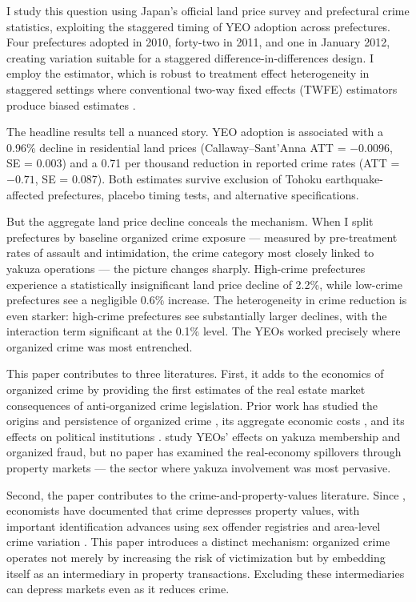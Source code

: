 \documentclass[12pt]{article}
\begin{document}
I study this question using Japan's official land price survey and prefectural crime statistics, exploiting the staggered timing of YEO adoption across prefectures. Four prefectures adopted in 2010, forty-two in 2011, and one in January 2012, creating variation suitable for a staggered difference-in-differences design. I employ the \citet{callaway2021difference} estimator, which is robust to treatment effect heterogeneity in staggered settings where conventional two-way fixed effects (TWFE) estimators produce biased estimates \citep{goodmanbacon2021difference}.

The headline results tell a nuanced story. YEO adoption is associated with a 0.96\% decline in residential land prices (Callaway--Sant'Anna ATT = $-0.0096$, SE = 0.003) and a 0.71 per thousand reduction in reported crime rates (ATT = $-0.71$, SE = 0.087). Both estimates survive exclusion of Tohoku earthquake-affected prefectures, placebo timing tests, and alternative specifications.

But the aggregate land price decline conceals the mechanism. When I split prefectures by baseline organized crime exposure --- measured by pre-treatment rates of assault and intimidation, the crime category most closely linked to yakuza operations --- the picture changes sharply. High-crime prefectures experience a statistically insignificant land price decline of 2.2\%, while low-crime prefectures see a negligible 0.6\% increase. The heterogeneity in crime reduction is even starker: high-crime prefectures see substantially larger declines, with the interaction term significant at the 0.1\% level. The YEOs worked precisely where organized crime was most entrenched.

This paper contributes to three literatures. First, it adds to the economics of organized crime by providing the first estimates of the real estate market consequences of anti-organized crime legislation. Prior work has studied the origins and persistence of organized crime \citep{bandiera2003land, buonanno2015poor}, its aggregate economic costs \citep{pinotti2015economic}, and its effects on political institutions \citep{dell2019putting}. \citet{hoshino2020containing} study YEOs' effects on yakuza membership and organized fraud, but no paper has examined the real-economy spillovers through property markets --- the sector where yakuza involvement was most pervasive.

Second, the paper contributes to the crime-and-property-values literature. Since \citet{thaler1978note}, economists have documented that crime depresses property values, with important identification advances using sex offender registries \citep{linden2008estimates, pope2008fear} and area-level crime variation \citep{gibbons2004cost, cullen1999crime}. This paper introduces a distinct mechanism: organized crime operates not merely by increasing the risk of victimization but by embedding itself as an intermediary in property transactions. Excluding these intermediaries can depress markets even as it reduces crime.
\end{document}
